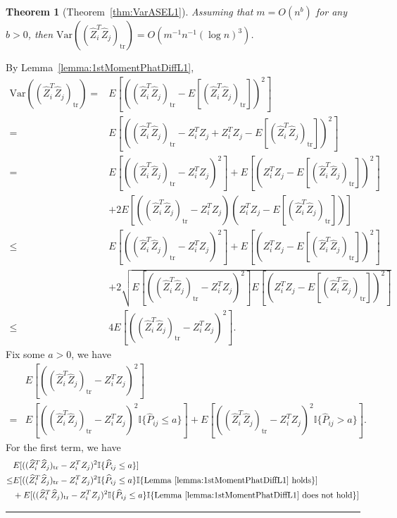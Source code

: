 \documentclass[a4paper]{article}
\newenvironment{proof}{{\bf Proof:  }}{\hfill\rule{2mm}{2mm}}
\newtheorem{theorem}[fact]{Theorem}
\renewcommand{\hat}{\widehat}
\begin{document}
\begin{theorem}[Theorem~\ref{thm:VarASEL1}]
\label{thm:VarASEL1proof}
Assuming that $m = O(n^b)$ for any $b > 0$, then $\mathrm{Var}((\hat{Z}_i^T \hat{Z}_j)_{\mathrm{tr}}) = O(m^{-1} n^{-1} (\log n)^3)$.
\end{theorem}
\begin{proof}
By Lemma~\ref{lemma:1stMomentPhatDiffL1},
\begin{align*}
	\mathrm{Var}((\hat{Z}_i^T \hat{Z}_j)_{\mathrm{tr}})
    = & E[((\hat{Z}_i^T \hat{Z}_j)_{\mathrm{tr}} - E[(\hat{Z}_i^T \hat{Z}_j)_{\mathrm{tr}}])^2] \\
    = & E[((\hat{Z}_i^T \hat{Z}_j)_{\mathrm{tr}} - Z_i^T Z_j + Z_i^T Z_j - E[(\hat{Z}_i^T \hat{Z}_j)_{\mathrm{tr}}])^2] \\
    = & E[((\hat{Z}_i^T \hat{Z}_j)_{\mathrm{tr}} - Z_i^T Z_j)^2] + E[(Z_i^T Z_j - E[(\hat{Z}_i^T \hat{Z}_j)_{\mathrm{tr}}])^2] \\ 
    & + 2E[((\hat{Z}_i^T \hat{Z}_j)_{\mathrm{tr}} - Z_i^T Z_j)(Z_i^T Z_j - E[(\hat{Z}_i^T \hat{Z}_j)_{\mathrm{tr}}])] \\
    \le & E[((\hat{Z}_i^T \hat{Z}_j)_{\mathrm{tr}} - Z_i^T Z_j)^2] + E[(Z_i^T Z_j - E[(\hat{Z}_i^T \hat{Z}_j)_{\mathrm{tr}}])^2] \\ 
    & + 2\sqrt{E[((\hat{Z}_i^T \hat{Z}_j)_{\mathrm{tr}} - Z_i^T Z_j)^2] E[(Z_i^T Z_j - E[(\hat{Z}_i^T \hat{Z}_j)_{\mathrm{tr}}])^2]} \\
    \le & 4 E[((\hat{Z}_i^T \hat{Z}_j)_{\mathrm{tr}} - Z_i^T Z_j)^2].
\end{align*}
Fix some $a > 0$, we have
\begin{align*}
	& E[((\hat{Z}_i^T \hat{Z}_j)_{\mathrm{tr}} - Z_i^T Z_j)^2] \\
	= & E[((\hat{Z}_i^T \hat{Z}_j)_{\mathrm{tr}} - Z_i^T Z_j)^2 \mathbb{I}\{\hat{P}_{ij} \le a\}]
	+ E[((\hat{Z}_i^T \hat{Z}_j)_{\mathrm{tr}} - Z_i^T Z_j)^2 \mathbb{I}\{\hat{P}_{ij} > a\}].
\end{align*}
For the first term, we have
\begin{align*}
	& E[((\hat{Z}_i^T \hat{Z}_j)_{\mathrm{tr}} - Z_i^T Z_j)^2 \mathbb{I}\{\hat{P}_{ij} \le a\}] \\
	\le & E[((\hat{Z}_i^T \hat{Z}_j)_{\mathrm{tr}} - Z_i^T Z_j)^2 \mathbb{I}\{\hat{P}_{ij} \le a\} \mathbb{I}\{\mathrm{Lemma\ } \ref{lemma:1stMomentPhatDiffL1} \mathrm{\ holds}\}] \\
	& + E[((\hat{Z}_i^T \hat{Z}_j)_{\mathrm{tr}} - Z_i^T Z_j)^2 \mathbb{I}\{\hat{P}_{ij} \le a\} \mathbb{I}\{\mathrm{Lemma\ } \ref{lemma:1stMomentPhatDiffL1} \mathrm{\ does\ not\ hold}\}] \\

\end{align*}
\end{proof}
\end{document}
